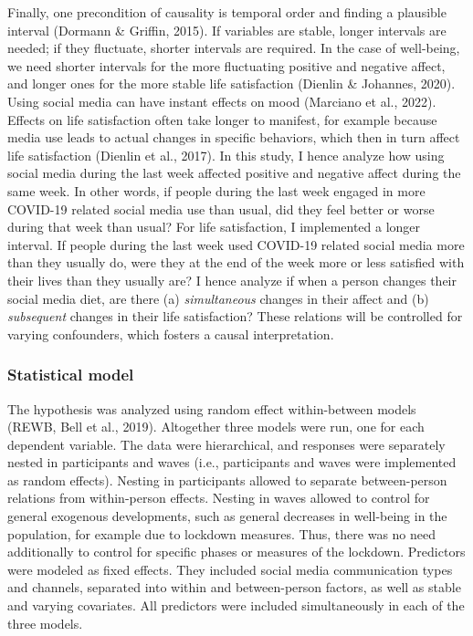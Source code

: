 \documentclass[
  man,mask,floatsintext]{apa7}
\begin{document}
Finally, one precondition of causality is temporal order and finding a plausible interval (Dormann \& Griffin, 2015).
If variables are stable, longer intervals are needed; if they fluctuate, shorter intervals are required.
In the case of well-being, we need shorter intervals for the more fluctuating positive and negative affect, and longer ones for the more stable life satisfaction (Dienlin \& Johannes, 2020).
Using social media can have instant effects on mood (Marciano et al., 2022).
Effects on life satisfaction often take longer to manifest, for example because media use leads to actual changes in specific behaviors, which then in turn affect life satisfaction (Dienlin et al., 2017).
In this study, I hence analyze how using social media during the last week affected positive and negative affect during the same week.
In other words, if people during the last week engaged in more COVID-19 related social media use than usual, did they feel better or worse during that week than usual?
For life satisfaction, I implemented a longer interval.
If people during the last week used COVID-19 related social media more than they usually do, were they at the end of the week more or less satisfied with their lives than they usually are?
I hence analyze if when a person changes their social media diet, are there (a) \emph{simultaneous} changes in their affect and (b) \emph{subsequent} changes in their life satisfaction?
These relations will be controlled for varying confounders, which fosters a causal interpretation.

\hypertarget{statistical-model}{%
\subsubsection{Statistical model}\label{statistical-model}}

The hypothesis was analyzed using random effect within-between models (REWB, Bell et al., 2019).
Altogether three models were run, one for each dependent variable.
The data were hierarchical, and responses were separately nested in participants and waves (i.e., participants and waves were implemented as random effects).
Nesting in participants allowed to separate between-person relations from within-person effects.
Nesting in waves allowed to control for general exogenous developments, such as general decreases in well-being in the population, for example due to lockdown measures.
Thus, there was no need additionally to control for specific phases or measures of the lockdown.
Predictors were modeled as fixed effects.
They included social media communication types and channels, separated into within and between-person factors, as well as stable and varying covariates.
All predictors were included simultaneously in each of the three models.
\end{document}
